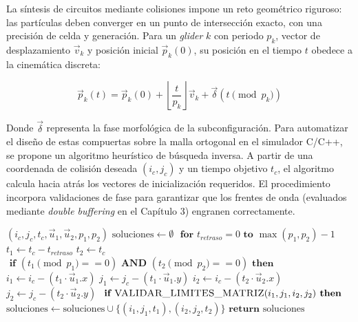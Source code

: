 La síntesis de circuitos mediante colisiones impone un reto geométrico riguroso: las partículas deben converger en un punto de intersección exacto, con una precisión de celda y generación. Para un \textit{glider} $k$ con periodo $p_k$, vector de desplazamiento $\vec{v}_k$ y posición inicial $\vec{p}_k(0)$, su posición en el tiempo $t$ obedece a la cinemática discreta:

\begin{equation}
\vec{p}_k(t) = \vec{p}_k(0) + \left\lfloor \frac{t}{p_k} \right\rfloor \vec{v}_k + \vec{\delta}(t \pmod{p_k})
\label{eq:cinematica_discreta}
\end{equation}

Donde $\vec{\delta}$ representa la fase morfológica de la subconfiguración. Para automatizar el diseño de estas compuertas sobre la malla ortogonal en el simulador C/C++, se propone un algoritmo heurístico de búsqueda inversa. A partir de una coordenada de colisión deseada $(i_c, j_c)$ y un tiempo objetivo $t_c$, el algoritmo calcula hacia atrás los vectores de inicialización requeridos. El procedimiento incorpora validaciones de fase para garantizar que los frentes de onda (evaluados mediante \textit{double buffering} en el Capítulo 3) engranen correctamente.

\begin{algorithm}[H]
\caption{Heurística de Sincronización Espaciotemporal para Circuitos de Colisión.}\label{alg:sync_gliders}
\begin{algorithmic}
\STATE 
{}$(i_c, j_c, t_c, \vec{u}_1, \vec{u}_2, p_1, p_2)$
\STATE \hspace{0.5cm}$ \text{soluciones} \gets \emptyset $
\STATE \hspace{0.5cm}$ \textbf{ for } t_{retraso} = 0 \textbf{ to } \max(p_1, p_2) - 1 $
\STATE \hspace{1.0cm}$ t_1 \gets t_c - t_{retraso} $
\STATE \hspace{1.0cm}$ t_2 \gets t_c $
\STATE \hspace{1.0cm}$ \textbf{ if } (t_1 \pmod{p_1} == 0) \textbf{ AND } (t_2 \pmod{p_2} == 0) \textbf{ then } $
\STATE \hspace{1.5cm}$ i_1 \gets i_c - (t_1 \cdot \vec{u}_1.x) $
\STATE \hspace{1.5cm}$ j_1 \gets j_c - (t_1 \cdot \vec{u}_1.y) $
\STATE \hspace{1.5cm}$ i_2 \gets i_c - (t_2 \cdot \vec{u}_2.x) $
\STATE \hspace{1.5cm}$ j_2 \gets j_c - (t_2 \cdot \vec{u}_2.y) $
\STATE \hspace{1.5cm}$ \textbf{ if } \textsc{VALIDAR\_LIMITES\_MATRIZ}(i_1, j_1, i_2, j_2) \textbf{ then } $
\STATE \hspace{2.0cm}$ \text{soluciones} \gets \text{soluciones} \cup \{(i_1, j_1, t_1), (i_2, j_2, t_2)\} $
\STATE \hspace{0.5cm}$ \textbf{return} \text{ soluciones } $
\STATE
\end{algorithmic}
\end{algorithm}

